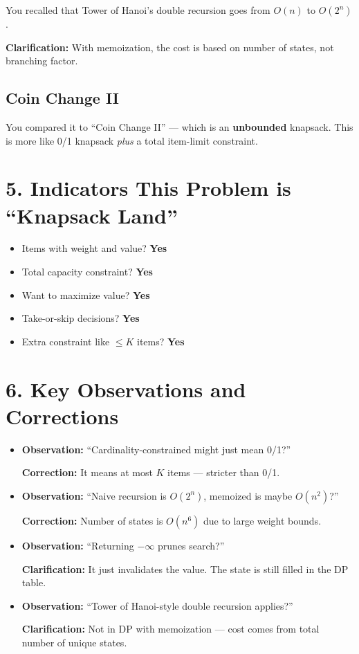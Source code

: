\documentclass[12pt]{article}
\begin{document}
You recalled that Tower of Hanoi’s double recursion goes from $O(n)$ to $O(2^n)$. 

\textbf{Clarification:} With memoization, the cost is based on number of states, not branching factor.

\subsection*{Coin Change II}

You compared it to “Coin Change II” — which is an \textbf{unbounded} knapsack. This is more like 0/1 knapsack \textit{plus} a total item-limit constraint.

\section*{5. Indicators This Problem is “Knapsack Land”}

\begin{itemize}
  \item Items with weight and value? \textbf{Yes}
  \item Total capacity constraint? \textbf{Yes}
  \item Want to maximize value? \textbf{Yes}
  \item Take-or-skip decisions? \textbf{Yes}
  \item Extra constraint like $\leq K$ items? \textbf{Yes}
\end{itemize}

\section*{6. Key Observations and Corrections}

\begin{itemize}
  \item \textbf{Observation:} “Cardinality-constrained might just mean 0/1?”
  
    \textbf{Correction:} It means at most $K$ items — stricter than 0/1.
  
  \item \textbf{Observation:} “Naive recursion is $O(2^n)$, memoized is maybe $O(n^2)$?”

    \textbf{Correction:} Number of states is $O(n^6)$ due to large weight bounds.

  \item \textbf{Observation:} “Returning $-\infty$ prunes search?”

    \textbf{Clarification:} It just invalidates the value. The state is still filled in the DP table.

  \item \textbf{Observation:} “Tower of Hanoi-style double recursion applies?”

    \textbf{Clarification:} Not in DP with memoization — cost comes from total number of unique states.
\end{itemize}
\end{document}
